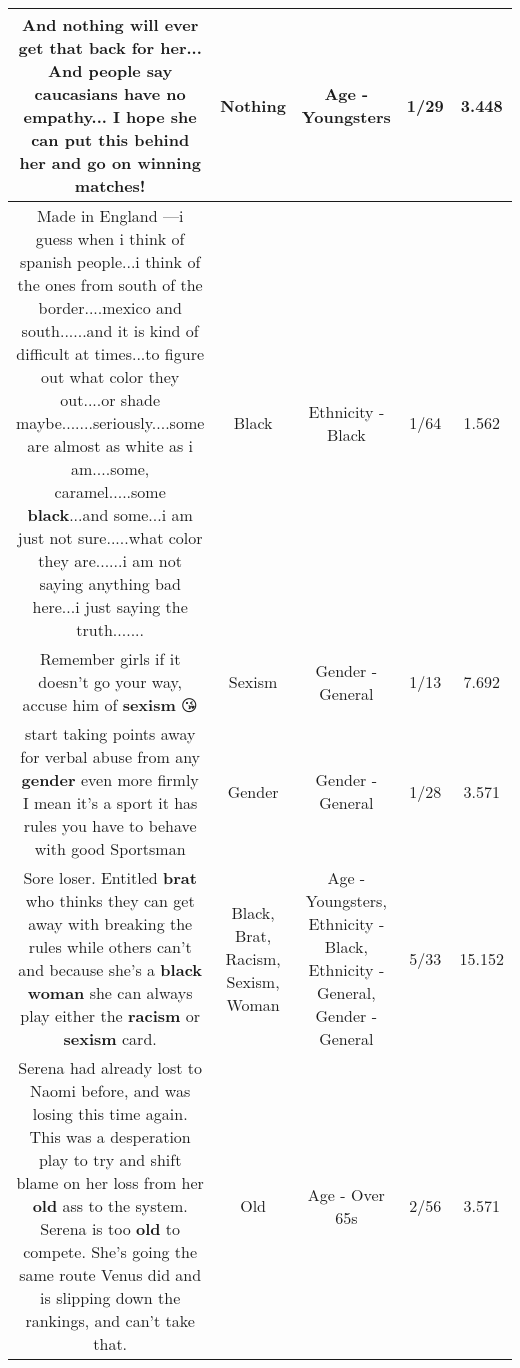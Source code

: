 \documentclass[11pt]{article}
\newlength\mylength
\begin{document}
\begin{center}
\begin{longtable}{|C{.65\mylength}|C{.30\mylength}|C{.12\mylength}|C{.12\mylength}|C{.12\mylength}|}
  \small And \textbf{nothing} will ever get that back for her... And people say caucasians have no empathy... I hope she can put this behind her and go on winning matches!\normalsize   & Nothing & Age - Youngsters & 1/29 & 3.448 \\  \hline
  \small Made in England ---i guess when i think of spanish people...i think of the ones from south of the border....mexico and south......and it is kind of difficult at times...to figure out what color they out....or shade maybe.......seriously....some are almost as white as i am....some, caramel.....some  \textbf{black}...and some...i am just not sure.....what color they are......i am not saying anything bad here...i just saying the truth.......\normalsize   & Black & Ethnicity - Black & 1/64 & 1.562 \\  \hline
  \small Remember girls if it doesn't go your way, accuse him of \textbf{sexism} 😘\normalsize   & Sexism & Gender - General & 1/13 & 7.692 \\  \hline
  \small start taking points away for verbal abuse from any \textbf{gender} even more firmly I mean it's a sport it has rules you have to behave with good Sportsman\normalsize   & Gender & Gender - General & 1/28 & 3.571 \\  \hline
  \small Sore loser. Entitled \textbf{brat} who thinks they can get away with breaking the rules while others can't and because she's a \textbf{black} \textbf{woman} she can always play either the \textbf{racism} or \textbf{sexism} card.\normalsize   & Black, Brat, Racism, Sexism, Woman & Age - Youngsters, Ethnicity - Black, Ethnicity - General, Gender - General & 5/33 & 15.152 \\  \hline
  \small Serena had already lost to Naomi before, and was losing this time again. This was a desperation play to try and shift blame on her loss from her \textbf{old} ass to the system. Serena is too \textbf{old} to compete. She's going the same route Venus did and is slipping down the rankings, and can't take that.\normalsize   & Old & Age - Over 65s & 2/56 & 3.571 \\  \hline

\end{longtable}
\end{center}
\end{document}
